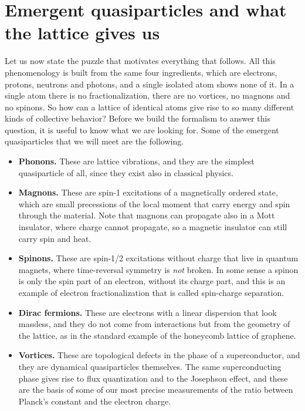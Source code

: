 \section{Emergent quasiparticles and what the lattice gives us}

Let us now state the puzzle that motivates everything that follows. All this phenomenology is
built from the same four ingredients, which are electrons, protons, neutrons and photons, and a
single isolated atom shows none of it. In a single atom there is no fractionalization, there are no
vortices, no magnons and no spinons. So how can a lattice of identical atoms give rise to so many
different kinds of collective behavior? Before we build the formalism to answer this question, it
is useful to know what we are looking for. Some of the emergent quasiparticles that we will meet are
the following.

\begin{itemize}
\item \textbf{Phonons.} These are lattice vibrations, and they are the simplest quasiparticle of
  all, since they exist also in classical physics.
\item \textbf{Magnons.} These are spin-1 excitations of a magnetically ordered state, which are
  small precessions of the local moment that carry energy and spin through the material. Note that
  magnons can propagate also in a Mott insulator, where charge cannot propagate, so a magnetic
  insulator can still carry spin and heat.
\item \textbf{Spinons.} These are spin-1/2 excitations without charge that live in quantum magnets,
  where time-reversal symmetry is \emph{not} broken. In some sense a spinon is only the spin part of
  an electron, without its charge part, and this is an example of electron fractionalization that
  is called spin-charge separation.
\item \textbf{Dirac fermions.} These are electrons with a linear dispersion that look massless, and
  they do not come from interactions but from the geometry of the lattice, as in the standard
  example of the honeycomb lattice of graphene.
\item \textbf{Vortices.} These are topological defects in the phase of a superconductor, and they
  are dynamical quasiparticles themselves. The same superconducting phase gives rise to flux quantization and
  to the Josephson effect, and these are the basis of some of our most precise measurements of the
  ratio between Planck's constant and the electron charge.
\end{itemize}

